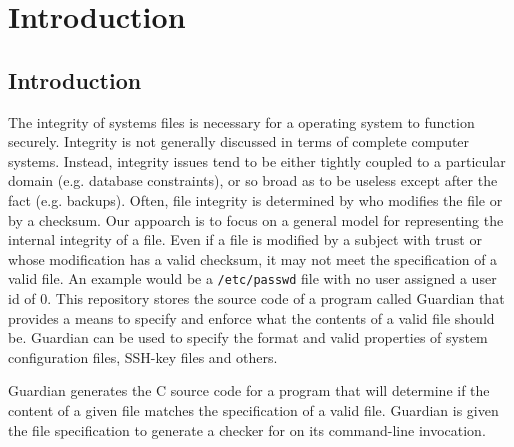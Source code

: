 
\chapter{Introduction}
{
	\section{Introduction}
	{
		The integrity of systems files is necessary for a operating system to
		function securely.  Integrity is not generally discussed in terms of
		complete computer systems. Instead, integrity issues tend to be either
		tightly coupled to a particular domain (e.g. database constraints), or
		so broad as to be useless except after the fact (e.g. backups).
		Often, file integrity is determined by who modifies the file or by a
		checksum. Our appoarch is to focus on a general model for representing
		the internal integrity of a file. Even if a file is modified by a
		subject with trust or whose modification has a valid checksum, it may
		not meet the specification of a valid file. An example would be a
		\texttt{/etc/passwd} file with no user assigned a user id of 0. This
		repository stores the source code of a program called Guardian that
		provides a means to specify and enforce what the contents of a valid
		file should be.
		Guardian can be used to specify the format and valid properties of
		system configuration files, SSH-key files and others.
		
		Guardian generates the C source code for a program that will determine
		if the content of a given file matches the specification of a valid
		file. Guardian is given the file specification to generate a checker for
		on its command-line invocation.
	}
}



















